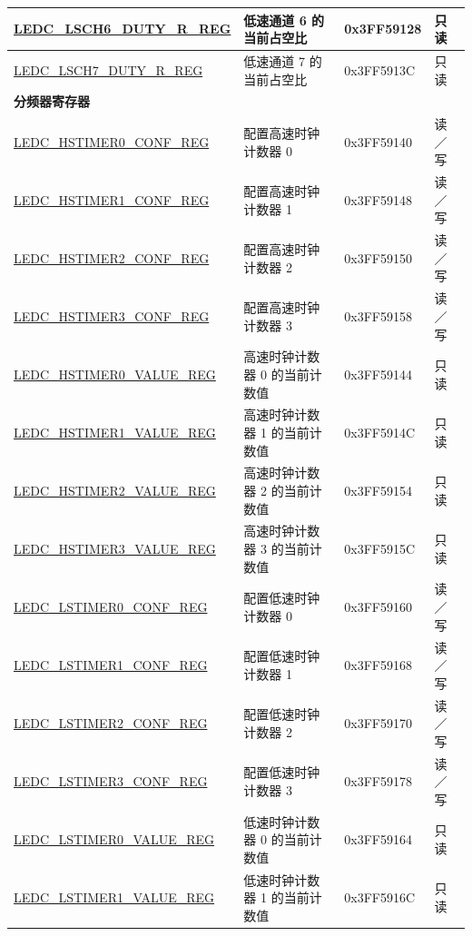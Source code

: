 \begin{longtable}{ | p{5cm} | p{7cm} | p{2.2cm} | p{1.2cm} | }
\hyperref[regdesc:LEDCLSCHnDUTYRREG]{LEDC\_LSCH6\_DUTY\_R\_REG} & 低速通道 6 的当前占空比 & 0x3FF59128 & 只读 \\ \hline
\hyperref[regdesc:LEDCLSCHnDUTYRREG]{LEDC\_LSCH7\_DUTY\_R\_REG} & 低速通道 7 的当前占空比 & 0x3FF5913C & 只读 \\ \hline
\multicolumn{4}{|l|}{\textbf{分频器寄存器}} \\ \hline
\hyperref[regdesc:LEDCHSTIMERnCONFREG]{LEDC\_HSTIMER0\_CONF\_REG} & 配置高速时钟计数器 0 & 0x3FF59140 & 读／写 \\ \hline
\hyperref[regdesc:LEDCHSTIMERnCONFREG]{LEDC\_HSTIMER1\_CONF\_REG} & 配置高速时钟计数器 1 & 0x3FF59148 & 读／写 \\ \hline
\hyperref[regdesc:LEDCHSTIMERnCONFREG]{LEDC\_HSTIMER2\_CONF\_REG} & 配置高速时钟计数器 2 & 0x3FF59150 & 读／写 \\ \hline
\hyperref[regdesc:LEDCHSTIMERnCONFREG]{LEDC\_HSTIMER3\_CONF\_REG} & 配置高速时钟计数器 3 & 0x3FF59158 & 读／写\\ \hline
\hyperref[regdesc:LEDCHSTIMERnVALUEREG]{LEDC\_HSTIMER0\_VALUE\_REG} & 高速时钟计数器 0 的当前计数值 & 0x3FF59144 & 只读 \\ \hline
\hyperref[regdesc:LEDCHSTIMERnVALUEREG]{LEDC\_HSTIMER1\_VALUE\_REG} & 高速时钟计数器 1 的当前计数值 & 0x3FF5914C & 只读 \\ \hline
\hyperref[regdesc:LEDCHSTIMERnVALUEREG]{LEDC\_HSTIMER2\_VALUE\_REG} & 高速时钟计数器 2 的当前计数值 & 0x3FF59154 & 只读 \\ \hline
\hyperref[regdesc:LEDCHSTIMERnVALUEREG]{LEDC\_HSTIMER3\_VALUE\_REG} & 高速时钟计数器 3 的当前计数值 & 0x3FF5915C & 只读 \\ \hline
\hyperref[regdesc:LEDCHSTIMERnCONFREG]{LEDC\_LSTIMER0\_CONF\_REG} & 配置低速时钟计数器 0 & 0x3FF59160 & 读／写 \\ \hline
\hyperref[regdesc:LEDCHSTIMERnCONFREG]{LEDC\_LSTIMER1\_CONF\_REG} & 配置低速时钟计数器 1 & 0x3FF59168 & 读／写 \\ \hline
\hyperref[regdesc:LEDCHSTIMERnCONFREG]{LEDC\_LSTIMER2\_CONF\_REG} & 配置低速时钟计数器 2 & 0x3FF59170 & 读／写 \\ \hline
\hyperref[regdesc:LEDCHSTIMERnCONFREG]{LEDC\_LSTIMER3\_CONF\_REG} & 配置低速时钟计数器 3 & 0x3FF59178 & 读／写 \\ \hline
\hyperref[regdesc:LEDCHSTIMERnVALUEREG]{LEDC\_LSTIMER0\_VALUE\_REG} & 低速时钟计数器 0 的当前计数值 & 0x3FF59164 & 只读 \\ \hline
\hyperref[regdesc:LEDCHSTIMERnVALUEREG]{LEDC\_LSTIMER1\_VALUE\_REG} & 低速时钟计数器 1 的当前计数值 & 0x3FF5916C &只读 \\ \hline

\end{longtable}
